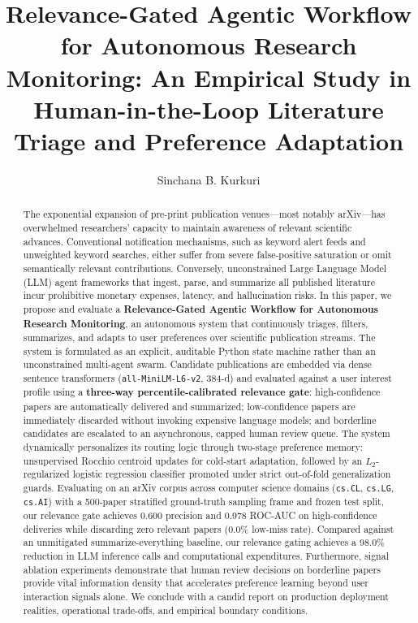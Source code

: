 \documentclass[sigconf,nonacm]{acmart}
\title[Relevance-Gated Agentic Workflow for Autonomous Research Monitoring]{Relevance-Gated Agentic Workflow for Autonomous Research Monitoring: An Empirical Study in Human-in-the-Loop Literature Triage and Preference Adaptation}
\author{Sinchana B. Kurkuri}
\affiliation{%
  \institution{Department of Computer Science and Engineering}
  \country{India}
}
\begin{document}
\begin{abstract}
The exponential expansion of pre-print publication venues---most notably arXiv---has overwhelmed researchers' capacity to maintain awareness of relevant scientific advances. Conventional notification mechanisms, such as keyword alert feeds and unweighted keyword searches, either suffer from severe false-positive saturation or omit semantically relevant contributions. Conversely, unconstrained Large Language Model (LLM) agent frameworks that ingest, parse, and summarize all published literature incur prohibitive monetary expenses, latency, and hallucination risks. In this paper, we propose and evaluate a \textbf{Relevance-Gated Agentic Workflow for Autonomous Research Monitoring}, an autonomous system that continuously triages, filters, summarizes, and adapts to user preferences over scientific publication streams. The system is formulated as an explicit, auditable Python state machine rather than an unconstrained multi-agent swarm. Candidate publications are embedded via dense sentence transformers (\texttt{all-MiniLM-L6-v2}, 384-d) and evaluated against a user interest profile using a \textbf{three-way percentile-calibrated relevance gate}: high-confidence papers are automatically delivered and summarized; low-confidence papers are immediately discarded without invoking expensive language models; and borderline candidates are escalated to an asynchronous, capped human review queue. The system dynamically personalizes its routing logic through two-stage preference memory: unsupervised Rocchio centroid updates for cold-start adaptation, followed by an $L_2$-regularized logistic regression classifier promoted under strict out-of-fold generalization guards. Evaluating on an arXiv corpus across computer science domains (\texttt{cs.CL}, \texttt{cs.LG}, \texttt{cs.AI}) with a 500-paper stratified ground-truth sampling frame and frozen test split, our relevance gate achieves 0.600 precision and 0.978 ROC-AUC on high-confidence deliveries while discarding zero relevant papers (0.0\% low-miss rate). Compared against an unmitigated summarize-everything baseline, our relevance gating achieves a 98.0\% reduction in LLM inference calls and computational expenditures. Furthermore, signal ablation experiments demonstrate that human review decisions on borderline papers provide vital information density that accelerates preference learning beyond user interaction signals alone. We conclude with a candid report on production deployment realities, operational trade-offs, and empirical boundary conditions.
\end{abstract}
\end{document}
